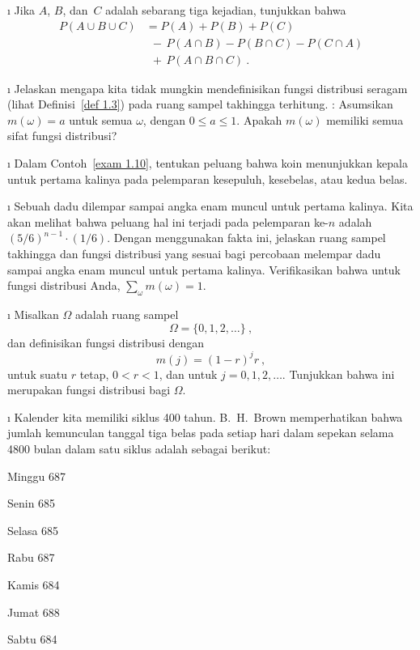 \begin{LJSItem}
\i\label{exer 1.2.18}
Jika $A$, $B$, dan~$C$ adalah sebarang tiga kejadian, tunjukkan bahwa
$$\begin{array}{ll}
P(A \cup B \cup C) &= P(A) + P(B) + P(C) \\
                   &\ \  -\, P(A \cap B) - P(B \cap C) - P(C \cap A) \\
                   &\ \  +\, P(A \cap B \cap C)\ .
\end{array}
$$

\i\label{exer 1.2.19} Jelaskan mengapa kita tidak mungkin mendefinisikan
fungsi distribusi seragam (lihat Definisi~\ref{def 1.3}) 
pada ruang sampel takhingga terhitung.  : Asumsikan $m(\omega) = a$
untuk semua
$\omega$, dengan $0 \leq a \leq 1$.  Apakah $m(\omega)$ memiliki semua sifat
fungsi
distribusi?

\i\label{exer 1.2.20} Dalam Contoh~\ref{exam 1.10}, tentukan peluang bahwa
koin
menunjukkan kepala untuk pertama kalinya pada pelemparan kesepuluh, kesebelas, atau kedua belas.

\i\label{exer 1.2.21} Sebuah dadu dilempar sampai angka enam muncul untuk
pertama kalinya.  Kita akan
melihat bahwa peluang hal ini terjadi pada pelemparan ke-$n$ adalah
$(5/6)^{n-1}\cdot(1/6)$.  Dengan menggunakan fakta ini, jelaskan ruang sampel takhingga
dan fungsi distribusi yang sesuai bagi percobaan melempar dadu sampai angka enam
muncul
untuk pertama kalinya.  Verifikasikan bahwa untuk fungsi distribusi Anda, $\sum_{\omega} m(\omega)
=
1$.

\i\label{exer 1.2.22} 
Misalkan $\Omega$ adalah ruang sampel
$$
\Omega = \{0,1,2,\dots\}\ ,
$$
dan definisikan fungsi distribusi dengan
$$
m(j) = (1 - r)^j r\ ,
$$
untuk suatu $r$ tetap, $0 < r < 1$, dan untuk $j = 0, 1, 2, \ldots$.
Tunjukkan bahwa ini merupakan fungsi distribusi bagi $\Omega$.

\i\label{exer 1.2.23} Kalender kita memiliki siklus 400 tahun.  
B.~H.~Brown
memperhatikan bahwa
jumlah kemunculan tanggal tiga belas pada setiap hari dalam
sepekan selama
4800 bulan dalam satu siklus adalah sebagai berikut:

\par Minggu 687
\par Senin 685
\par Selasa 685
\par Rabu 687
\par Kamis 684
\par Jumat 688
\par Sabtu 684


\end{LJSItem}
